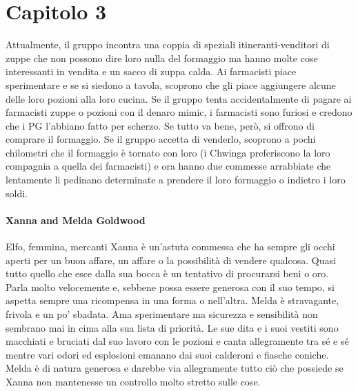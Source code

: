 \documentclass{article}
\begin{document}
\section{Capitolo 3}
Attualmente, il gruppo incontra una coppia di speziali itineranti-venditori di zuppe che non possono dire loro nulla del formaggio ma hanno molte cose interessanti in vendita e un sacco di zuppa calda.
Ai farmacisti piace sperimentare e se si siedono a tavola, scoprono che gli piace aggiungere alcune delle loro pozioni alla loro cucina. Se il gruppo tenta accidentalmente di pagare ai farmacisti zuppe o pozioni con il denaro mimic, i farmacisti sono furiosi e credono che i PG l'abbiano fatto per scherzo.
Se tutto va bene, però, si offrono di comprare il formaggio.
Se il gruppo accetta di venderlo, scoprono a pochi chilometri che il formaggio è tornato con loro (i Chwinga preferiscono la loro compagnia a quella dei farmacisti) e ora hanno due commesse arrabbiate che lentamente li pedinano determinate a prendere il loro formaggio o indietro i loro soldi.

\paragraph{Xanna and Melda Goldwood}
Elfo, femmina, mercanti
Xanna è un'astuta commessa che ha sempre gli occhi aperti per un buon affare, un affare o la possibilità di vendere qualcosa. Quasi tutto quello che esce dalla sua bocca è un tentativo di procurarsi beni o oro. Parla molto velocemente e, sebbene possa essere generosa con il suo tempo, si aspetta sempre una ricompensa in una forma o nell'altra.
Melda è stravagante, frivola e un po' sbadata. Ama sperimentare ma sicurezza e sensibilità non sembrano mai in cima alla sua lista di priorità. Le sue dita e i suoi vestiti sono macchiati e bruciati dal suo lavoro con le pozioni e canta allegramente tra sé e sé mentre vari odori ed esplosioni emanano dai suoi calderoni e fiasche coniche.
Melda è di natura generosa e darebbe via allegramente tutto ciò che possiede se Xanna non mantenesse un controllo molto stretto sulle cose.
\end{document}
